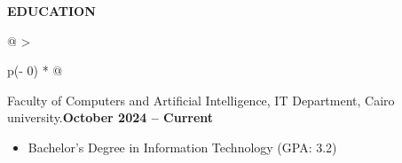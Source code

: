 \documentclass[a4paper]{article}
\begin{document}
\textbf{EDUCATION}
\vspace{-8pt}
\nopagebreak[4]
\begin{longtable}[]{@{}
  >{\raggedright\arraybackslash}p{(\columnwidth - 0\tabcolsep) * }@{}}
\toprule\noalign{}
\endhead
\endlastfoot
\vspace{0pt}
\begin{minipage}[t]{\linewidth}\raggedright
Faculty of Computers and Artificial Intelligence, IT Department, Cairo
    university.\hspace{10em}\textbf{October 2024 -- Current}

\begin{itemize}
\item
  Bachelor's Degree in Information Technology (GPA: 3.2)
\end{itemize}
\end{minipage} \\
\end{longtable}
\end{document}
